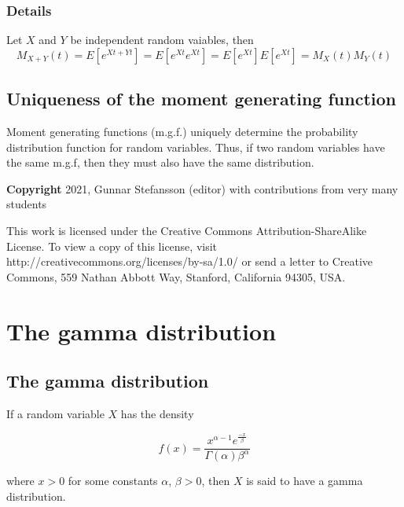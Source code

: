 \documentclass[12pt,a4paper]{article}
\theoremstyle{regla}
\theoremstyle{remark}
\theoremstyle{definition}
\theoremstyle{nonumberbreak}
\begin{document}
\subsubsection{Details}
Let $X$ and $Y$ be independent random vaiables, then
$$M_{X+Y}(t)=E[e^{Xt+Yt}]=E[e^{Xt}e^{Xt}]=E[e^{Xt}]E[e^{Xt}]=M_{X}(t)M_{Y}(t)$$

\subsection{Uniqueness of the moment generating function}
\begin{fbox}
\begin{minipage}{0.97\textwidth}
Moment generating functions (m.g.f.) uniquely determine the probability distribution function for random variables.  Thus, if two random variables have the same m.g.f, then they must also have the same distribution.

\end{minipage}
\end{fbox}

{\bf Copyright}
2021, Gunnar Stefansson (editor) with contributions from very many students

This work is licensed under the Creative Commons
Attribution-ShareAlike License. To view a copy of this license, visit
http://creativecommons.org/licenses/by-sa/1.0/ or send a letter to
Creative Commons, 559 Nathan Abbott Way, Stanford, California 94305,
USA.
\clearpage
\section{The gamma distribution}
\subsection{The gamma distribution}
\begin{fbox}
\begin{minipage}{0.97\textwidth}
If a random variable $X$ has the density 

$$f(x) = \frac{x^{\alpha-1} e^{\frac{-x} {\beta}}} {\Gamma(\alpha) \beta^{\alpha}}$$

where $x>0$ for some constants $\alpha$, $\beta>0$, then $X$ is said to have a gamma distribution.
\end{minipage}
\end{fbox}
\end{document}
